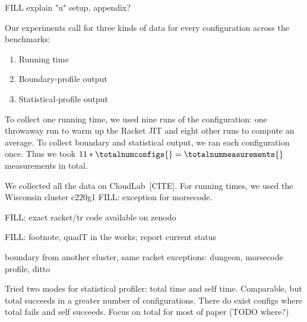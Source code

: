 FILL explain "u" setup, appendix?



Our experiments call for three kinds of data for every configuration across the benchmarks:
\begin{enumerate}
  \item Running time
  \item Boundary-profile output
  \item Statistical-profile output
\end{enumerate}

To collect one running time, we used nine runs of the configuration:
one throwaway run to warm up the Racket JIT and eight other runs to compute an average.
To collect boundary and statistical output, we ran each configuration once.
Thus we took $11 * \totalnumconfigs{} = \totalnummeasurements{}$ measurements in total.

We collected all the data on CloudLab~[CITE].
For running times, we used the Wisconsin cluster c220g1 
FILL: exception for morsecode.

FILL: exact racket/tr code available on zenodo

FILL: footnote, quadT in the works; report current status

boundary from another cluster, same racket
exceptions: dungeon, morsecode
profile, ditto

Tried two modes for statistical profiler: total time and self time.
Comparable, but total succeeds in a greater number of configurations.
There do exist configs where total fails and self succeeds.
Focus on total for most of paper (TODO where?)


